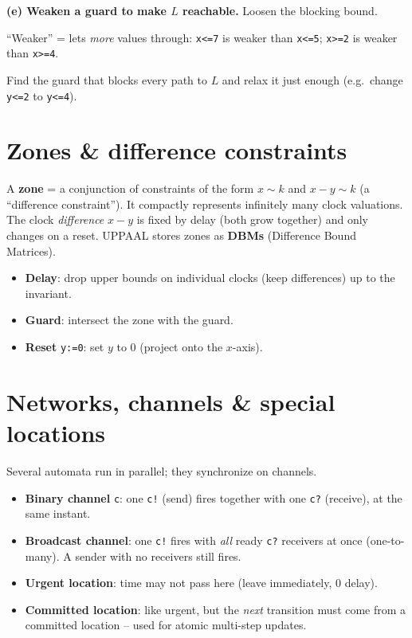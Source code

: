 \textbf{(e) Weaken a guard to make $L$ reachable.} Loosen the blocking bound.
\begin{keybox}
\centering ``Weaker'' = lets \emph{more} values through: \texttt{x<=7} is weaker than \texttt{x<=5}; \texttt{x>=2} is weaker than \texttt{x>=4}.
\end{keybox}
Find the guard that blocks every path to $L$ and relax it just enough (e.g.\ change \texttt{y<=2} to \texttt{y<=4}).

\section{Zones \& difference constraints}
A \textbf{zone} = a conjunction of constraints of the form $x\sim k$ and $x-y\sim k$ (a ``difference constraint''). It compactly represents infinitely many clock valuations. The clock \emph{difference} $x-y$ is fixed by delay (both grow together) and only changes on a reset. UPPAAL stores zones as \textbf{DBMs} (Difference Bound Matrices).
\begin{itemize}
\item \textbf{Delay}: drop upper bounds on individual clocks (keep differences) up to the invariant.
\item \textbf{Guard}: intersect the zone with the guard.
\item \textbf{Reset} \texttt{y:=0}: set $y$ to 0 (project onto the $x$-axis).
\end{itemize}

\section{Networks, channels \& special locations}
\label{sec:ta-networks}
Several automata run in parallel; they synchronize on channels.
\begin{itemize}
\item \textbf{Binary channel} \texttt{c}: one \texttt{c!} (send) fires together with one \texttt{c?} (receive), at the same instant.
\item \textbf{Broadcast channel}: one \texttt{c!} fires with \emph{all} ready \texttt{c?} receivers at once (one-to-many). A sender with no receivers still fires.
\item \textbf{Urgent location}: time may not pass here (leave immediately, 0 delay).
\item \textbf{Committed location}: like urgent, but the \emph{next} transition must come from a committed location -- used for atomic multi-step updates.
\end{itemize}

